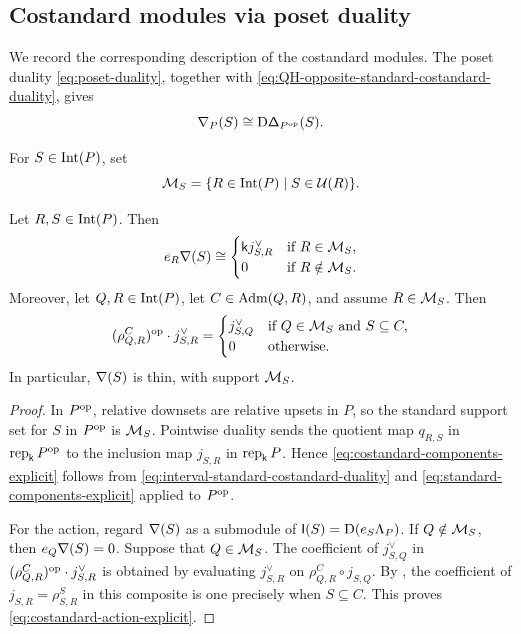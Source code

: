 \subsection{Costandard modules via poset duality}
\label{sec:costandard-via-duality}

We record the corresponding description of the costandard modules.
The poset duality \eqref{eq:poset-duality}, together with
\eqref{eq:QH-opposite-standard-costandard-duality}, gives
\begin{equation}
\mathsf\nabla_P(S)
\cong
\mathrm D\mathsf\Delta_{P^{\mathrm{op}}}(S).
\label{eq:interval-standard-costandard-duality}
\end{equation}

For $S\in\operatorname{Int}(P)$, set
\begin{equation}
\mathcal M_S
=
\{R\in\operatorname{Int}(P)\mid S\in\mathcal U(R)\}.
\label{eq:costandard-support-set}
\end{equation}

\begin{proposition}
\label{prop:costandard-concrete-model}
Let $R,S\in\operatorname{Int}(P)$. Then
\begin{equation}
e_R\mathsf\nabla(S)
\cong
\begin{cases}
\mathsf{k} j_{S,R}^{\vee} & \text{if } R\in\mathcal M_S,\\
0                  & \text{if } R\notin\mathcal M_S.
\end{cases}
\label{eq:costandard-components-explicit}
\end{equation}
Moreover, let $Q,R\in\operatorname{Int}(P)$, let $C\in\operatorname{Adm}(Q,R)$, and assume
$R\in\mathcal M_S$. Then
\begin{equation}
(\rho_{Q,R}^{C})^{\mathrm{op}}\cdot j_{S,R}^{\vee}
=
\begin{cases}
j_{S,Q}^{\vee}
& \text{if } Q\in\mathcal M_S \text{ and } S\subseteq C,\\
0
& \text{otherwise}.
\end{cases}
\label{eq:costandard-action-explicit}
\end{equation}
In particular, $\mathsf\nabla(S)$ is thin, with support $\mathcal M_S$.
\end{proposition}

\begin{proof}
In $P^{\mathrm{op}}$, relative downsets are relative upsets in $P$, so the
standard support set for $S$ in $P^{\mathrm{op}}$ is $\mathcal M_S$. Pointwise
duality sends the quotient map $q_{R,S}$ in $\operatorname{rep}_{\mathsf{k}}P^{\mathrm{op}}$ to
the inclusion map $j_{S,R}$ in $\operatorname{rep}_{\mathsf{k}}P$. Hence
\eqref{eq:costandard-components-explicit} follows from
\eqref{eq:interval-standard-costandard-duality} and
\eqref{eq:standard-components-explicit} applied to $P^{\mathrm{op}}$.

For the action, regard $\mathsf\nabla(S)$ as a submodule of
$\mathsf I(S)=\mathrm D(e_S\Lambda_P)$. If $Q\notin\mathcal M_S$, then
$e_Q\mathsf\nabla(S)=0$. Suppose that $Q\in\mathcal M_S$. The coefficient of
$j_{S,Q}^{\vee}$ in
$(\rho_{Q,R}^{C})^{\mathrm{op}}\cdot j_{S,R}^{\vee}$ is obtained by
evaluating $j_{S,R}^{\vee}$ on
$\rho_{Q,R}^{C}\circ j_{S,Q}$. By
, the coefficient of
$j_{S,R}=\rho_{S,R}^{S}$ in this composite is one precisely when
$S\subseteq C$. This proves \eqref{eq:costandard-action-explicit}.
\end{proof}

